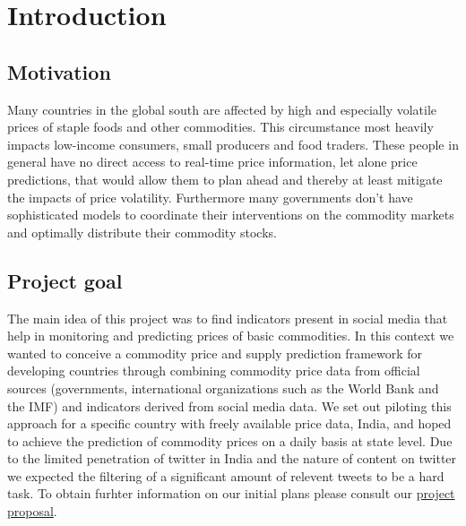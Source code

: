 \section*{Introduction}
\subsection*{Motivation}
Many countries in the global south are affected by high and especially volatile prices of staple foods and other commodities. This circumstance most heavily impacts low-income consumers, small producers and food traders. These people in general have no direct access to real-time price information, let alone price predictions, that would allow them to plan ahead and thereby at least mitigate the impacts of price volatility. Furthermore many governments don’t have sophisticated models to coordinate their interventions on the commodity markets and optimally distribute their commodity stocks.

\subsection*{Project goal}
The main idea of this project was to find indicators present in social media that help in monitoring and predicting prices of basic commodities. In this context we wanted to conceive a commodity price and supply prediction framework for developing countries through combining commodity price data from official sources (governments, international organizations such as the World Bank and the IMF) and indicators derived from social media data. We set out piloting this approach for a specific country with freely available price data, India, and hoped to achieve the prediction of commodity prices on a daily basis at state level. Due to the limited penetration of twitter in India and the nature of content on twitter we expected the filtering of a significant amount of relevent tweets to be a hard task. To obtain furhter information on our initial plans please consult our \href{http://wiki.epfl.ch/predicting-commodity-prices.big-data/proposal}{project proposal}.
